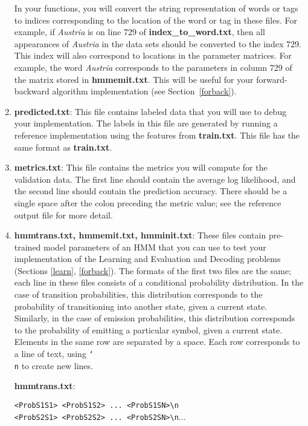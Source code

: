 \documentclass[11pt,addpoints,answers]{exam}
\begin{document}
\begin{enumerate}
In your functions, you will convert the string representation of words or tags to indices corresponding to the location of the word or tag in these files. For example, if \textit{Austria} is on line 729 of \textbf{index\_to\_word.txt}, then all appearances of \textit{Austria} in the data sets should be converted to the index 729. This index will also correspond to locations in the parameter matrices. For example, the word \textit{Austria} corresponds to the parameters in column 729 of the matrix stored in \textbf{hmmemit.txt}. This will be useful for your forward-backward algorithm implementation (see Section~\ref{forback}).

\item \textbf{predicted.txt}: This file contains labeled data that you will use to debug your implementation. The labels in this file are generated by running a reference implementation using the features from \textbf{train.txt}. This file has the same format as \textbf{train.txt}.

\item \textbf{metrics.txt}: This file contains the metrics you will compute for the validation data. The first line should contain the average log likelihood, and the second line should contain the prediction accuracy. There should be a single space after the colon preceding the metric value; see the reference output file for more detail.  

\item \textbf{hmmtrans.txt, hmmemit.txt, hmminit.txt}: These files contain pre-trained model parameters of an HMM that you can use to test your implementation of the Learning and Evaluation and Decoding problems (Sections \ref{learn}, \ref{forback}). The formats of the first two files are the same; each line in these files consists of a conditional probability distribution. In the case of transition probabilities, this distribution corresponds to the probability of transitioning into another state, given a current state. Similarly, in the case of emission probabilities, this distribution corresponds to the probability of emitting a particular symbol, given a current state. Elements in the same row are separated by a space. Each row corresponds to a line of text, using \texttt{\char`\\ n} to create new lines.
    
\textbf{hmmtrans.txt}:

\texttt{<ProbS1S1> <ProbS1S2> ... <ProbS1SN>\textbackslash n}\\
\texttt{<ProbS2S1> <ProbS2S2> ... <ProbS2SN>\textbackslash n}...


\end{enumerate}
\end{document}
